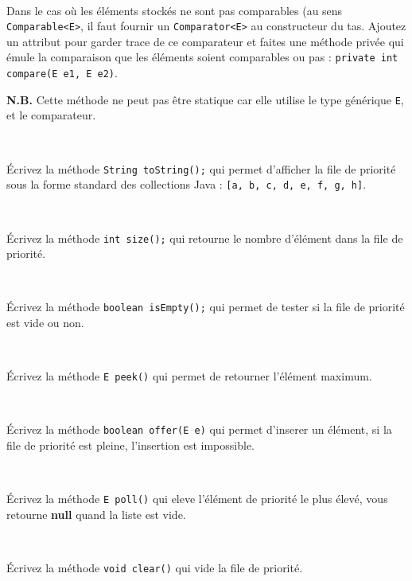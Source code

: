 \documentclass[iutinfo,a4paper,11pt]{ustl-tdtp}
\begin{document}
~\\

Dans le cas où les éléments stockés ne sont pas comparables (au sens \texttt{Comparable<E>}, il faut
fournir un \texttt{Comparator<E>} au constructeur du tas. Ajoutez un
attribut pour garder trace de ce comparateur et faites une méthode
privée qui émule la comparaison que les éléments soient comparables ou
pas : \texttt{private int compare(E e1, E e2)}.

\noindent \textbf{N.B.} Cette méthode ne peut pas être statique car
elle utilise le type générique \texttt{E}, et le comparateur.


~\\

Écrivez la méthode \texttt{String toString();} qui permet d'afficher
la file de priorité sous la forme standard des collections Java :
\texttt{[a, b, c, d, e, f, g, h]}.

~\\

Écrivez la méthode \texttt{int size();} qui retourne le nombre
d'élément dans la file de priorité.

~\\

Écrivez la méthode \texttt{boolean isEmpty();} qui permet de tester si
la file de priorité est vide ou non.

~\\

Écrivez la méthode \texttt{E peek()} qui permet de retourner l'élément maximum.

~\\

Écrivez la méthode \texttt{boolean offer(E e)} qui permet
d'inserer un élément, si la file de priorité est pleine, l'insertion est impossible.

~\\

Écrivez la méthode \texttt{E poll()} qui eleve l'élément de priorité le plus élevé, vous retourne \textbf{null} quand la liste est vide.

~\\

Écrivez la méthode \texttt{void clear()} qui vide la file de priorité.
\end{document}
